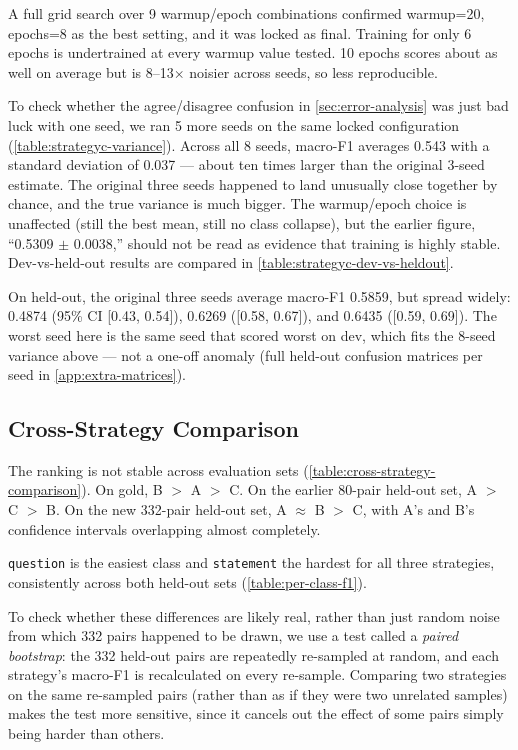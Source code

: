 A full grid search over 9 warmup/epoch combinations confirmed
warmup=20, epochs=8 as the best setting, and it was locked as final.
Training for only 6 epochs is undertrained at every warmup value tested.
10 epochs scores about as well on average but is 8--13$\times$ noisier
across seeds, so less reproducible.

To check whether the agree/disagree confusion in
\autoref{sec:error-analysis} was just bad luck with one seed, we ran 5
more seeds on the same locked configuration
(\autoref{table:strategyc-variance}). Across all 8 seeds, macro-F1
averages 0.543 with a standard deviation of 0.037 --- about ten times
larger than the original 3-seed estimate. The original three seeds
happened to land unusually close together by chance, and the true
variance is much bigger. The warmup/epoch choice is unaffected (still
the best mean, still no class collapse), but the earlier figure,
``0.5309 $\pm$ 0.0038,'' should not be read as evidence that training is
highly stable. Dev-vs-held-out results are compared in
\autoref{table:strategyc-dev-vs-heldout}.

On held-out, the original three seeds average macro-F1 0.5859, but
spread widely: 0.4874 (95\% CI [0.43, 0.54]), 0.6269 ([0.58, 0.67]), and
0.6435 ([0.59, 0.69]). The worst seed here is the same seed that scored
worst on dev, which fits the 8-seed variance above --- not a one-off
anomaly (full held-out confusion matrices per seed in
\autoref{app:extra-matrices}).

\subsection{Cross-Strategy Comparison}
\label{sec:no-ranking}

The ranking is not stable across evaluation sets (\autoref{table:cross-strategy-comparison}).
On gold, B $>$ A $>$ C. On the earlier 80-pair held-out set, A $>$ C $>$ B.
On the new 332-pair held-out set, A $\approx$ B $>$ C, with A's and B's
confidence intervals overlapping almost completely.

\texttt{question} is the easiest class and \texttt{statement} the hardest for
all three strategies, consistently across both held-out sets
(\autoref{table:per-class-f1}).

To check whether these differences are likely real, rather than just
random noise from which 332 pairs happened to be drawn, we use a test
called a \emph{paired bootstrap}: the 332 held-out pairs are repeatedly
re-sampled at random, and each strategy's macro-F1 is recalculated on
every re-sample. Comparing two strategies on the same re-sampled pairs
(rather than as if they were two unrelated samples) makes the test more
sensitive, since it cancels out the effect of some pairs simply being
harder than others.

